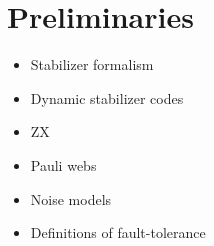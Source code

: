 \chapter{Preliminaries}\label{ch:prelims}

\begin{itemize}
    \item Stabilizer formalism
    \item Dynamic stabilizer codes
    \item ZX
    \item Pauli webs
    \item Noise models
    \item Definitions of fault-tolerance
\end{itemize}


